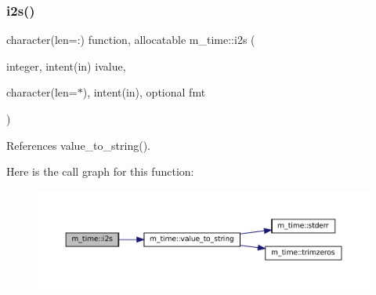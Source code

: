 \subsubsection{\texorpdfstring{i2s()}{i2s()}}
{\footnotesize\ttfamily character(len=\+:) function, allocatable m\+\_\+time\+::i2s (\begin{DoxyParamCaption}\item[{integer, intent(in)}]{ivalue,  }\item[{character(len=$\ast$), intent(in), optional}]{fmt }\end{DoxyParamCaption})\hspace{0.3cm}{\ttfamily [private]}}



References value\+\_\+to\+\_\+string().

Here is the call graph for this function\+:\nopagebreak
\begin{figure}[H]
\begin{center}
\leavevmode
\includegraphics[width=350pt]{namespacem__time_a7ae85160c5039dad604fd05efad2445f_cgraph}
\end{center}
\end{figure}
\mbox{\label{namespacem__time_a72455f763954fae8ebc0f454033d82a8}} 
